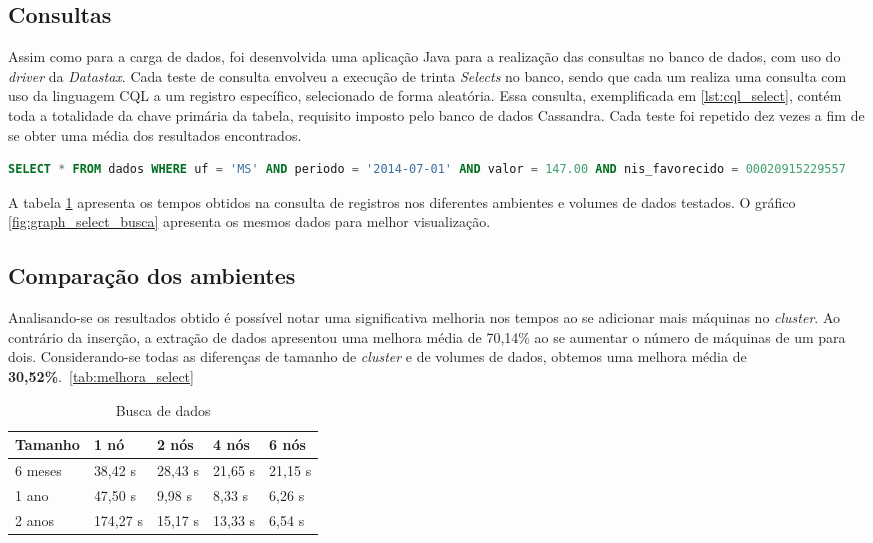 \subsection{Consultas}
Assim como para a carga de dados, foi desenvolvida uma aplicação Java para a realização das consultas no banco de dados, com uso do \emph{driver} da \emph{Datastax}. Cada teste de consulta envolveu a execução de trinta \emph{Selects} no banco, sendo que cada um realiza uma consulta com uso da linguagem CQL a um registro específico, selecionado de forma aleatória. Essa consulta, exemplificada em \ref{lst:cql_select}, contém toda a totalidade da chave primária da tabela, requisito imposto pelo banco de dados Cassandra. Cada teste foi repetido dez vezes a fim de se obter uma média dos resultados encontrados.

\begin{lstlisting}[caption={Consulta CQL},label={lst:cql_select},language=SQL]
SELECT * FROM dados WHERE uf = 'MS' AND periodo = '2014-07-01' AND valor = 147.00 AND nis_favorecido = 00020915229557
\end{lstlisting}

A tabela \ref{tab:select_busca} apresenta os tempos obtidos na consulta de registros nos diferentes ambientes e volumes de dados testados. O gráfico \ref{fig:graph_select_busca} apresenta os mesmos dados para melhor visualização.

\subsection{Comparação dos ambientes}
Analisando-se os resultados obtido é possível notar uma significativa melhoria nos tempos ao se adicionar mais máquinas no \emph{cluster}. Ao contrário da inserção, a extração de dados apresentou uma melhora média de 70,14\% ao se aumentar o número de máquinas de um para dois. Considerando-se todas as diferenças de tamanho de \emph{cluster} e de volumes de dados, obtemos uma melhora média de \textbf{30,52\%}.~\ref{tab:melhora_select}

\begin{table}[]
	\centering
	\caption{Busca de dados}
	\label{tab:select_busca}
	\begin{tabular}{lllll}
		\textbf{Tamanho} & \textbf{1 nó} & \textbf{2 nós} & \textbf{4 nós} & \textbf{6 nós} \\ \hline
		6 meses          & 38,42 s		 & 28,43 s        & 21,65 s        & 21,15 s        \\ \hline
		1 ano            & 47,50 s 		 & 9,98 s         & 8,33 s         & 6,26 s         \\ \hline
		2 anos           & 174,27 s		 & 15,17 s        & 13,33 s        & 6,54 s         \\ \hline
	\end{tabular}
\end{table}

